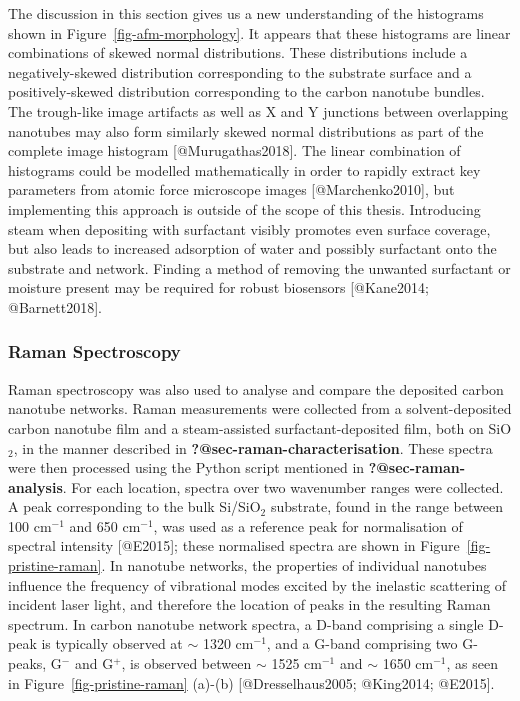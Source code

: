\documentclass[
  letterpaper,
  DIV=11,
  numbers=noendperiod]{scrartcl}
\begin{document}
The discussion in this section gives us a new understanding of the
histograms shown in Figure~\ref{fig-afm-morphology}. It appears that
these histograms are linear combinations of skewed normal distributions.
These distributions include a negatively-skewed distribution
corresponding to the substrate surface and a positively-skewed
distribution corresponding to the carbon nanotube bundles. The
trough-like image artifacts as well as X and Y junctions between
overlapping nanotubes may also form similarly skewed normal
distributions as part of the complete image histogram
{[}@Murugathas2018{]}. The linear combination of histograms could be
modelled mathematically in order to rapidly extract key parameters from
atomic force microscope images {[}@Marchenko2010{]}, but implementing
this approach is outside of the scope of this thesis. Introducing steam
when depositing with surfactant visibly promotes even surface coverage,
but also leads to increased adsorption of water and possibly surfactant
onto the substrate and network. Finding a method of removing the
unwanted surfactant or moisture present may be required for robust
biosensors {[}@Kane2014; @Barnett2018{]}.

\hypertarget{sec-pristine-raman}{%
\subsubsection{Raman Spectroscopy}\label{sec-pristine-raman}}

Raman spectroscopy was also used to analyse and compare the deposited
carbon nanotube networks. Raman measurements were collected from a
solvent-deposited carbon nanotube film and a steam-assisted
surfactant-deposited film, both on SiO\(_2\), in the manner described in
\textbf{?@sec-raman-characterisation}. These spectra were then processed
using the Python script mentioned in \textbf{?@sec-raman-analysis}. For
each location, spectra over two wavenumber ranges were collected. A peak
corresponding to the bulk Si/SiO\(_2\) substrate, found in the range
between 100 cm\(^{-1}\) and 650 cm\(^{-1}\), was used as a reference
peak for normalisation of spectral intensity {[}@E2015{]}; these
normalised spectra are shown in Figure~\ref{fig-pristine-raman}. In
nanotube networks, the properties of individual nanotubes influence the
frequency of vibrational modes excited by the inelastic scattering of
incident laser light, and therefore the location of peaks in the
resulting Raman spectrum. In carbon nanotube network spectra, a D-band
comprising a single D-peak is typically observed at \(\sim\) 1320
cm\(^{-1}\), and a G-band comprising two G-peaks, G\(^-\) and G\(^+\),
is observed between \(\sim\) 1525 cm\(^{-1}\) and \(\sim\) 1650
cm\(^{-1}\), as seen in Figure~\ref{fig-pristine-raman} (a)-(b)
{[}@Dresselhaus2005; @King2014; @E2015{]}.
\end{document}
